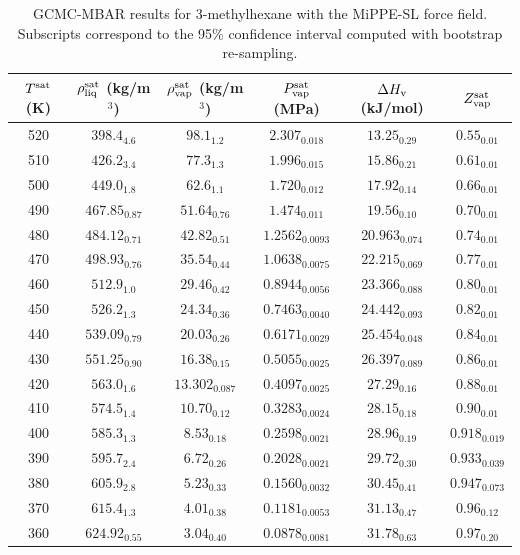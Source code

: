 \documentclass[journal=jctc,manuscript=article]{achemso}
\begin{document}
\begin{table}[htb!]
	\caption{GCMC-MBAR results for 3-methylhexane with the MiPPE-SL force field. Subscripts correspond to the 95\% confidence interval computed with bootstrap re-sampling.}
	\begin{center}
		\begin{tabular}{|c|c|c|c|c|c|}
			\hline
			$T^{\rm sat}$ (K) & $\rho_{\rm liq}^{\rm sat}$ (kg/m$^3$) & $\rho_{\rm vap}^{\rm sat}$ (kg/m$^3$) & $P_{\rm vap}^{\rm sat}$ (MPa) & $\Delta H_{\rm v}$ (kJ/mol) & $Z_{\rm vap}^{\rm sat}$ \\ \hline
			520 & $398.4_{4.6}$ & $98.1_{1.2}$ & $2.307_{0.018}$ & $13.25_{0.29}$ & $0.55_{0.01}$ \\
			510 & $426.2_{3.4}$ & $77.3_{1.3}$ & $1.996_{0.015}$ & $15.86_{0.21}$ & $0.61_{0.01}$ \\
			500 & $449.0_{1.8}$ & $62.6_{1.1}$ & $1.720_{0.012}$ & $17.92_{0.14}$ & $0.66_{0.01}$ \\
			490 & $467.85_{0.87}$ & $51.64_{0.76}$ & $1.474_{0.011}$ & $19.56_{0.10}$ & $0.70_{0.01}$ \\
			480 & $484.12_{0.71}$ & $42.82_{0.51}$ & $1.2562_{0.0093}$ & $20.963_{0.074}$ & $0.74_{0.01}$ \\
			470 & $498.93_{0.76}$ & $35.54_{0.44}$ & $1.0638_{0.0075}$ & $22.215_{0.069}$ & $0.77_{0.01}$ \\
			460 & $512.9_{1.0}$ & $29.46_{0.42}$ & $0.8944_{0.0056}$ & $23.366_{0.088}$ & $0.80_{0.01}$ \\
			450 & $526.2_{1.3}$ & $24.34_{0.36}$ & $0.7463_{0.0040}$ & $24.442_{0.093}$ & $0.82_{0.01}$ \\
			440 & $539.09_{0.79}$ & $20.03_{0.26}$ & $0.6171_{0.0029}$ & $25.454_{0.048}$ & $0.84_{0.01}$ \\
			430 & $551.25_{0.90}$ & $16.38_{0.15}$ & $0.5055_{0.0025}$ & $26.397_{0.089}$ & $0.86_{0.01}$ \\
			420 & $563.0_{1.6}$ & $13.302_{0.087}$ & $0.4097_{0.0025}$ & $27.29_{0.16}$ & $0.88_{0.01}$ \\
			410 & $574.5_{1.4}$ & $10.70_{0.12}$ & $0.3283_{0.0024}$ & $28.15_{0.18}$ & $0.90_{0.01}$ \\
			400 & $585.3_{1.3}$ & $8.53_{0.18}$ & $0.2598_{0.0021}$ & $28.96_{0.19}$ & $0.918_{0.019}$ \\
			390 & $595.7_{2.4}$ & $6.72_{0.26}$ & $0.2028_{0.0021}$ & $29.72_{0.30}$ & $0.933_{0.039}$ \\
			380 & $605.9_{2.8}$ & $5.23_{0.33}$ & $0.1560_{0.0032}$ & $30.45_{0.41}$ & $0.947_{0.073}$ \\
			370 & $615.4_{1.3}$ & $4.01_{0.38}$ & $0.1181_{0.0053}$ & $31.13_{0.47}$ & $0.96_{0.12}$ \\
			360 & $624.92_{0.55}$ & $3.04_{0.40}$ & $0.0878_{0.0081}$ & $31.78_{0.63}$ & $0.97_{0.20}$ \\
			\hline
		\end{tabular}
	\end{center}
\end{table}
\end{document}
